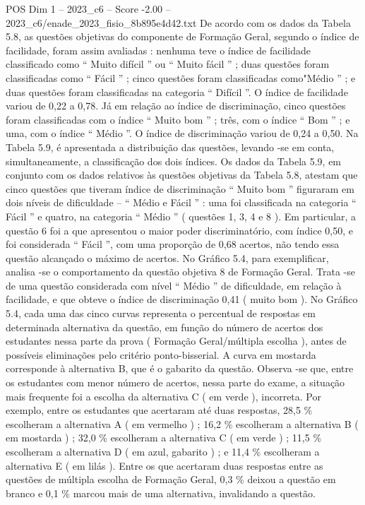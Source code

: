 \begin{textsample}{POS Dim 1 – 2023\_c6 – Score -2.00 – 2023\_c6/enade\_2023\_fisio\_8b895e4d42.txt}
De acordo com os dados da Tabela 5.8, as questões objetivas do componente de Formação Geral, segundo o índice de facilidade, foram assim avaliadas : nenhuma teve o índice de facilidade classificado como “ Muito difícil ” ou “ Muito fácil ” ; duas questões foram classificadas como “ Fácil ” ; cinco questões foram classificadas como"Médio ” ; e duas questões foram classificadas na categoria “ Difícil ”.
O índice de facilidade variou de 0,22 a 0,78.
Já em relação ao índice de discriminação, cinco questões foram classificadas com o índice “ Muito bom ” ; três, com o índice “ Bom ” ; e uma, com o índice “ Médio ”.
O índice de discriminação variou de 0,24 a 0,50.
Na Tabela 5.9, é apresentada a distribuição das questões, levando -se em conta, simultaneamente, a classificação dos dois índices.
Os dados da Tabela 5.9, em conjunto com os dados relativos às questões objetivas da Tabela 5.8, atestam que cinco questões que tiveram índice de discriminação “ Muito bom ” figuraram em dois níveis de dificuldade – “ Médio e Fácil ” : uma foi classificada na categoria “ Fácil ” e quatro, na categoria “ Médio ” ( questões 1, 3, 4 e 8 ).
Em particular, a questão 6 foi a que apresentou o maior poder discriminatório, com índice 0,50, e foi considerada “ Fácil ”, com uma proporção de 0,68 acertos, não tendo essa questão alcançado o máximo de acertos.
No Gráfico 5.4, para exemplificar, analisa -se o comportamento da questão objetiva 8 de Formação Geral.
Trata -se de uma questão considerada com nível “ Médio ” de dificuldade, em relação à facilidade, e que obteve o índice de discriminação 0,41 ( muito bom ).
No Gráfico 5.4, cada uma das cinco curvas representa o percentual de respostas em determinada alternativa da questão, em função do número de acertos dos estudantes nessa parte da prova ( Formação Geral/múltipla escolha ), antes de possíveis eliminações pelo critério ponto-bisserial.
A curva em mostarda corresponde à alternativa B, que é o gabarito da questão.
Observa -se que, entre os estudantes com menor número de acertos, nessa parte do exame, a situação mais frequente foi a escolha da alternativa C ( em verde ), incorreta.
Por exemplo, entre os estudantes que acertaram até duas respostas, 28,5 \% escolheram a alternativa A ( em vermelho ) ; 16,2 \% escolheram a alternativa B ( em mostarda ) ; 32,0 \% escolheram a alternativa C ( em verde ) ; 11,5 \% escolheram a alternativa D ( em azul, gabarito ) ; e 11,4 \% escolheram a alternativa E ( em lilás ).
Entre os que acertaram duas respostas entre as questões de múltipla escolha de Formação Geral, 0,3 \% deixou a questão em branco e 0,1 \% marcou mais de uma alternativa, invalidando a questão.

\end{textsample}
